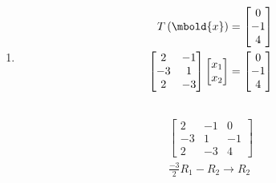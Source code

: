 \documentclass[12pt letter openany]{report}
\begin{document}
{\begin{enumerate}
\begin{align*}
            \text{Hence } A                                                                       & = \begin{bmatrix}
                                                                                                        2  & -1 \\
                                                                                                        -3 & 1  \\
                                                                                                        2  & -3
                                                                                                      \end{bmatrix}                                                                  \\
          \end{align*}
    \item
          \begin{align*}
            T \left( \mbold{x} \right)                             & = \begin{bmatrix} 0 \\ -1 \\ 4 \end{bmatrix} \\
            \begin{bmatrix}
              2  & -1 \\
              -3 & 1  \\
              2  & -3
            \end{bmatrix} \begin{bmatrix} x_1 \\ x_2 \end{bmatrix} & = \begin{bmatrix} 0 \\ -1 \\ 4 \end{bmatrix} \\
            \\
          \end{align*}
          \begin{align*}
            \begin{bmatrix}
              2  & -1 & 0  \\
              -3 & 1  & -1 \\
              2  & -3 & 4
            \end{bmatrix}                         \\
            \frac{-3}{2}R_1 - R_2  \rightarrow R_2 \\

\end{align*}
\end{enumerate}}
\end{document}
